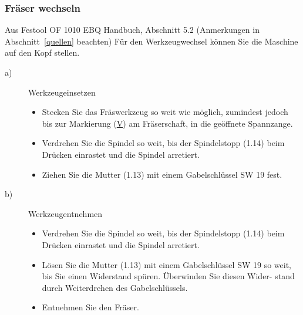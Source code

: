 \documentclass{\basedir/fablab-document}
\begin{document}
\subsubsection{Fräser wechseln}
\begin{leftbar}{Aus Festool OF 1010 EBQ Handbuch, Abschnitt 5.2 (Anmerkungen in Abschnitt~\ref{quellen} beachten)}
Für den Werkzeugwechsel können Sie die Maschine auf den Kopf stellen.
\begin{description}
    \item[a)] Werkzeugeinsetzen
        \begin{itemize}
            \item Stecken Sie das Fräswerkzeug so weit wie möglich, zumindest jedoch bis zur Markierung (\underline{V}) am Fräserschaft, in die geöffnete Spannzange.
            \item Verdrehen Sie die Spindel so weit, bis der Spindelstopp (1.14) beim Drücken einrastet und die Spindel arretiert.
            \item Ziehen Sie die Mutter (1.13) mit einem Gabelschlüssel SW 19 fest.
        \end{itemize}
    \item[b)] Werkzeugentnehmen
        \begin{itemize}
            \item Verdrehen Sie die Spindel so weit, bis der Spindelstopp (1.14) beim Drücken einrastet und die Spindel arretiert.
            \item Lösen Sie die Mutter (1.13) mit einem Gabelschlüssel SW 19 so weit, bis Sie einen Widerstand spüren. Überwinden Sie diesen Wider- stand durch Weiterdrehen des Gabelschlüssels.
            \item Entnehmen Sie den Fräser.
        \end{itemize}
\end{description}
\end{leftbar}
\end{document}
